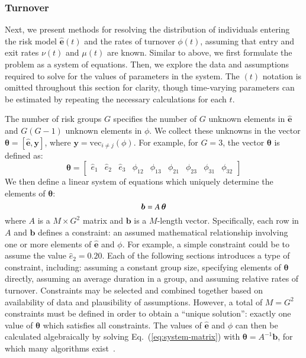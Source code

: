 \subsubsection{Turnover}
\label{sss:params-turnover}
Next, we present methods for resolving
the distribution of individuals entering the risk model $\bm{\hat{e}}(t)$ and
the rates of turnover $\phi(t)$,
assuming that entry and exit rates $\nu(t)$ and $\mu(t)$ are known.
Similar to above, we first formulate the problem as a system of equations.
Then, we explore the data and assumptions required
to solve for the values of parameters in the system.
The $(t)$ notation is omitted throughout this section for clarity,
though time-varying parameters can be estimated by
repeating the necessary calculations for each $t$.
\par
The number of risk groups $G$ specifies the number of
$G$ unknown elements in $\bm{\hat{e}}$ and $G(G-1)$ unknown elements in $\phi$.
We collect these unknowns in the vector
$\bm{\theta} = \left[\bm{\hat{e}}, \bm{y}\right]$,
where $\bm{y} = \mathrm{vec}_{i \ne j}(\phi)$.
For example, for $G = 3$, the vector $\bm{\theta}$ is defined as:
\begin{equation}
\bm{\theta} = \left[
\begin{array}{ccccccccc}
\hat{e}_1 & \hat{e}_2 & \hat{e}_3 & \phi_{12} & \phi_{13} & \phi_{21} & \phi_{23} & \phi_{31} & \phi_{32}
\end{array}\right]
\end{equation}
We then define a linear system of equations
which uniquely determine the elements of $\bm{\theta}$:
\begin{equation}\label{eq:system-matrix}
\bm{b} = A \thinspace \bm{\theta}
\end{equation}
where $A$ is a $M \times G^2$ matrix
and $\bm{b}$ is a $M$-length vector.
Specifically, each row in $A$ and $\bm{b}$ defines a constraint:
an assumed mathematical relationship involving one or more elements of
$\bm{\hat{e}}$ and $\phi$.
For example, a simple constraint could be to assume the value $\hat{e}_2 = 0.20$.
Each of the following sections introduces a type of constraint, including:
assuming a constant group size,
specifying elements of $\bm{\theta}$ directly,
assuming an average duration in a group,
and assuming relative rates of turnover.
Constraints may be selected and combined together based on
availability of data and plausibility of assumptions.
However, a total of $M = G^2$ constraints must be defined
in order to obtain a ``unique solution'':
exactly one value of $\bm{\theta}$ which satisfies all constraints.
The values of $\bm{\hat{e}}$ and $\phi$
can then be calculated algebraically by solving Eq.~(\ref{eq:system-matrix})
with $\bm{\theta} = A^{-1}\bm{b}$,
for which many algorithms exist~\citep{LAPACK}.
